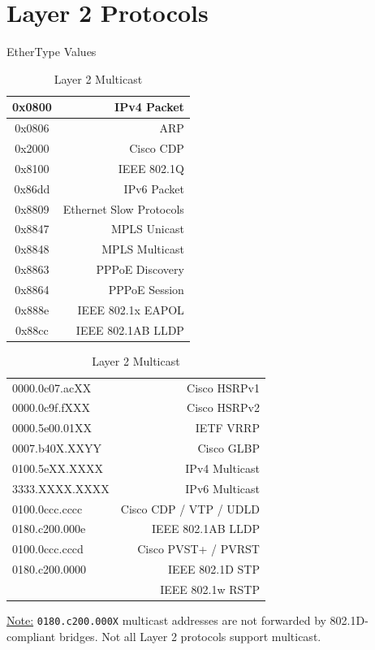 \documentclass[12pt]{article}
\newif\ifcolor											%
\newcommand{\note}[1]{\ifcolor \colorbox{#1}{Note:}\else \underline{Note:}\fi}
\begin{document}
\section{Layer 2 Protocols \label{sec:L2}}
	\begin{table}[H]
	\begin{minipage}[t]{.4\linewidth}
	\centering
	\caption{EtherType Values \label{tab:ETHERTYPE}}
	\begin{tabular}{| >{\ttfamily}c | r |}\hline
	0x0800	& IPv4 Packet\\\hline
	0x0806	& ARP\\\hline
	0x2000	& Cisco CDP\\\hline
	0x8100	& IEEE 802.1Q\\\hline
	0x86dd	& IPv6 Packet\\\hline
	0x8809	& Ethernet Slow Protocols\\\hline
	0x8847	& MPLS Unicast\\
	0x8848	& MPLS Multicast\\\hline
	0x8863	& PPPoE Discovery\\
	0x8864	& PPPoE Session\\\hline
	0x888e	& IEEE 802.1x EAPOL\\\hline
	0x88cc	& IEEE 802.1AB LLDP\\\hline
	\end{tabular}\end{minipage}\hfill
	\begin{minipage}[t]{.6\linewidth}
	\centering
	\caption{Layer 2 Multicast \label{tab:MULTICAST L2}}
	\begin{tabular}{| >{\ttfamily}l | r |}\hline
	0000.0c07.acXX		& Cisco HSRPv1\\
	0000.0c9f.fXXX		& Cisco HSRPv2\\\hline
	0000.5e00.01XX 		& IETF VRRP\\\hline
	0007.b40X.XXYY		& Cisco GLBP\\\hline
	0100.5eXX.XXXX		& IPv4 Multicast\\
	3333.XXXX.XXXX		& IPv6 Multicast\\\hline
	0100.0ccc.cccc	 	& Cisco CDP / VTP / UDLD\\\hline
	0180.c200.000e	 	& IEEE 802.1AB LLDP\\\hline
	0100.0ccc.cccd		& Cisco PVST+ / PVRST\\\hline
	0180.c200.0000	 	& IEEE 802.1D STP\\
					& IEEE 802.1w RSTP\\\hline
	\end{tabular}\end{minipage}\end{table}
	\note{Goldenrod} \texttt{0180.c200.000X} multicast addresses are not forwarded by 802.1D-compliant bridges. Not all Layer 2 protocols support multicast.
\end{document}
